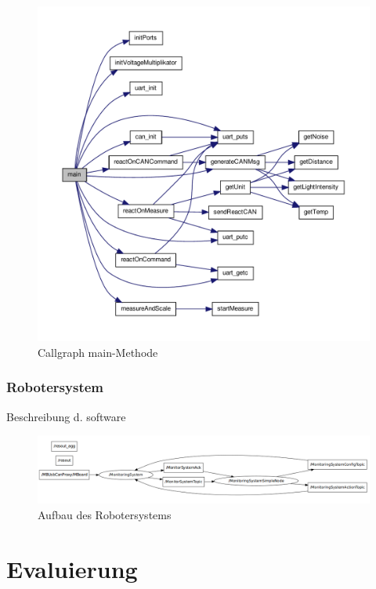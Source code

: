 \documentclass[
	11pt,								%
	a4paper,						%
	oneside,						%
	titlepage,					%
	headsepline,				%
	DIV13,							%
	abstracton,	 				%
	BCOR0cm,						%
	bibliography=totoc, %
]{scrreprt}							%
\begin{document}
  \begin{figure}[htb]
\centering
\includegraphics{images/main.pdf}
\caption{Callgraph main-Methode}
\label{fig:prototyp}
\end{figure}
 
  
  \subsection{Robotersystem}
  
  Beschreibung d. software \\
  
\begin{figure}[htb]
\centering
\includegraphics[width=1.0\textwidth]{images/ros.png}
\caption{Aufbau des Robotersystems}
\label{fig:prototyp}
\end{figure}
 






\chapter{Evaluierung}
\end{document}
